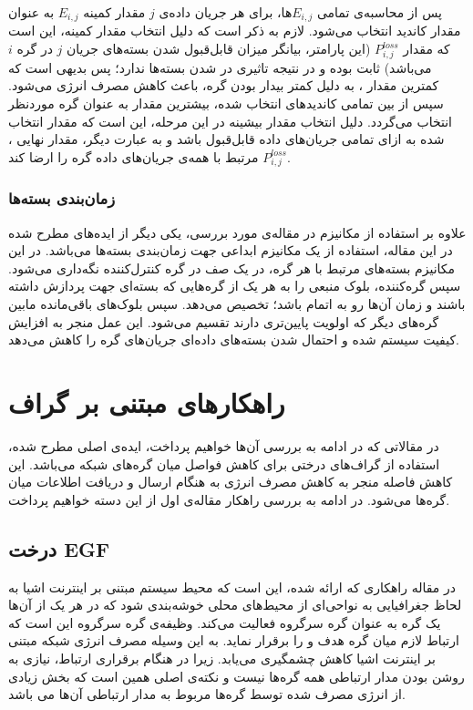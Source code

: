 \par
پس از محاسبه‌ی تمامی $E_{i, j}$ها، برای هر جریان داده‌ی $j$ مقدار کمینه $E_{i, j}$ به عنوان مقدار کاندید  انتخاب می‌شود. لازم به ذکر است که دلیل انتخاب مقدار کمینه، این است که مقدار $P^{loss}_{i, j}$ (این پارامتر، بیانگر میزان قابل‌قبول  شدن بسته‌های جریان $j$ در گره $i$ می‌باشد) ثابت بوده و در نتیجه تاثیری در  شدن بسته‌ها ندارد؛ پس بدیهی است که کمترین مقدار ، به دلیل کمتر بیدار بودن گره، باعث کاهش مصرف انرژی می‌شود. سپس از بین تمامی کاندیدهای انتخاب شده، بیشترین مقدار به عنوان  گره موردنظر انتخاب می‌گردد. دلیل انتخاب مقدار بیشینه در این مرحله، این است که مقدار انتخاب شده به ازای تمامی جریان‌های داده قابل‌قبول باشد و به عبارت دیگر، مقدار نهایی  ،$P^{loss}_{i, j}$ مرتبط با همه‌ی جریان‌های داده گره را ارضا کند. 

\subsubsection{زمان‌بندی بسته‌ها}
علاوه بر استفاده از مکانیزم  در مقاله‌ی مورد بررسی، یکی دیگر از ایده‌های مطرح شده در این مقاله، استفاده از یک مکانیزم ابداعی جهت زمان‌بندی بسته‌ها می‌باشد. در این مکانیزم بسته‌های مرتبط با هر گره، در یک صف در گره کنترل‌کننده نگه‌داری می‌شود. سپس گره‌کننده، بلوک منبعی را به هر یک از گره‌هایی که بسته‌ای جهت پردازش داشته باشند و زمان  آن‌ها رو به اتمام باشد؛ تخصیص می‌دهد. سپس بلوک‌های باقی‌مانده مابین گره‌های دیگر که اولویت پایین‌تری دارند تقسیم می‌شود. این عمل منجر به افزایش کیفیت سیستم شده و احتمال  شدن بسته‌های داده‌ای جریان‌های گره را کاهش می‌دهد.

\section{راهکارهای مبتنی بر گراف}
در مقالاتی که در ادامه به بررسی آن‌ها خواهیم پرداخت، ایده‌ی اصلی مطرح شده، استفاده از گراف‌های درختی برای کاهش فواصل میان گره‌های شبکه می‌باشد. این کاهش فاصله منجر به کاهش مصرف انرژی به هنگام ارسال و دریافت اطلاعات میان گره‌ها می‌شود. در ادامه به بررسی راهکار مقاله‌ی اول از این دسته خواهیم پرداخت.

\subsection{درخت EGF}
در مقاله \cite{} راهکاری که ارائه شده، این است که محیط سیستم مبتنی بر اینترنت اشیا به لحاظ جغرافیایی به نواحی‌ای از محیط‌های محلی خوشه‌بندی شود که در هر یک از آن‌ها یک گره به عنوان گره سرگروه فعالیت می‌کند. وظیفه‌ی گره سرگروه این است که ارتباط لازم میان گره هدف و  را برقرار نماید. به این وسیله مصرف انرژی شبکه مبتنی بر اینترنت اشیا کاهش چشمگیری می‌یابد. زیرا در هنگام برقراری ارتباط، نیازی به روشن بودن مدار ارتباطی همه گره‌ها نیست و نکته‌ی اصلی همین است که بخش زیادی از انرژی مصرف شده توسط گره‌ها مربوط به مدار ارتباطی آن‌ها می باشد.

